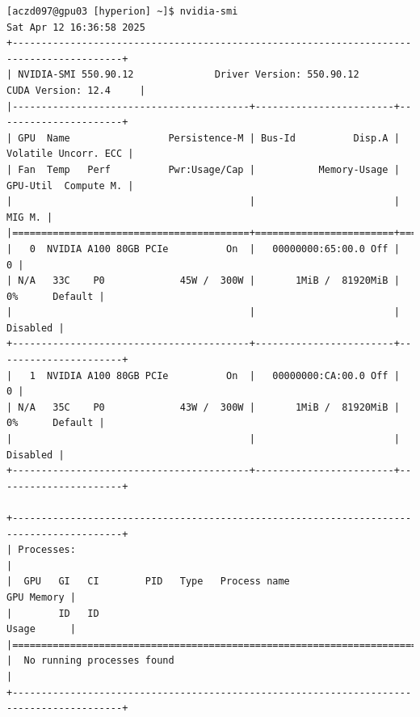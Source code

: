 \begin{verbatim}
[aczd097@gpu03 [hyperion] ~]$ nvidia-smi
Sat Apr 12 16:36:58 2025       
+-----------------------------------------------------------------------------------------+
| NVIDIA-SMI 550.90.12              Driver Version: 550.90.12      CUDA Version: 12.4     |
|-----------------------------------------+------------------------+----------------------+
| GPU  Name                 Persistence-M | Bus-Id          Disp.A | Volatile Uncorr. ECC |
| Fan  Temp   Perf          Pwr:Usage/Cap |           Memory-Usage | GPU-Util  Compute M. |
|                                         |                        |               MIG M. |
|=========================================+========================+======================|
|   0  NVIDIA A100 80GB PCIe          On  |   00000000:65:00.0 Off |                    0 |
| N/A   33C    P0             45W /  300W |       1MiB /  81920MiB |      0%      Default |
|                                         |                        |             Disabled |
+-----------------------------------------+------------------------+----------------------+
|   1  NVIDIA A100 80GB PCIe          On  |   00000000:CA:00.0 Off |                    0 |
| N/A   35C    P0             43W /  300W |       1MiB /  81920MiB |      0%      Default |
|                                         |                        |             Disabled |
+-----------------------------------------+------------------------+----------------------+
                                                                                         
+-----------------------------------------------------------------------------------------+
| Processes:                                                                              |
|  GPU   GI   CI        PID   Type   Process name                              GPU Memory |
|        ID   ID                                                               Usage      |
|=========================================================================================|
|  No running processes found                                                             |
+-----------------------------------------------------------------------------------------+


\end{verbatim}
